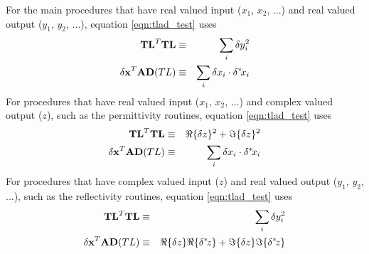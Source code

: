 For the main procedures that have real valued input ($x_1$, $x_2$, ...) and real valued output ($y_1$, $y_2$, ...), equation \ref{eqn:tlad_test} uses
\begin{eqnarray*}
  \mathbf{TL}^{T}\mathbf{TL}           &\equiv& \sum_{i}\delta y_{i}^{2}\\
  \mathbf{\delta x}^{T}\mathbf{AD}(TL) &\equiv& \sum_{i}\delta x_{i}\cdot\delta^{*}\! x_{i}
\end{eqnarray*}
For procedures that have real valued input ($x_1$, $x_2$, ...) and complex valued output ($z$), such as the permittivity routines, equation \ref{eqn:tlad_test} uses
\begin{eqnarray*}
  \mathbf{TL}^{T}\mathbf{TL}           &\equiv& \Re\{\delta{z}\}^{2} + \Im\{\delta{z}\}^{2}\\
  \mathbf{\delta x}^{T}\mathbf{AD}(TL) &\equiv& \sum_{i}\delta x_{i}\cdot\delta^{*}\! x_{i}
\end{eqnarray*}
For procedures that have complex valued input ($z$) and real valued output ($y_1$, $y_2$, ...), such as the reflectivity routines, equation \ref{eqn:tlad_test} uses
\begin{eqnarray*}
  \mathbf{TL}^{T}\mathbf{TL}           &\equiv& \sum_{i}\delta y_{i}^{2}\\
  \mathbf{\delta x}^{T}\mathbf{AD}(TL) &\equiv& \Re\{\delta{z}\}\Re\{\delta^{*}\! {z}\} + \Im\{\delta{z}\}\Im\{\delta^{*}\! {z}\}
\end{eqnarray*}

